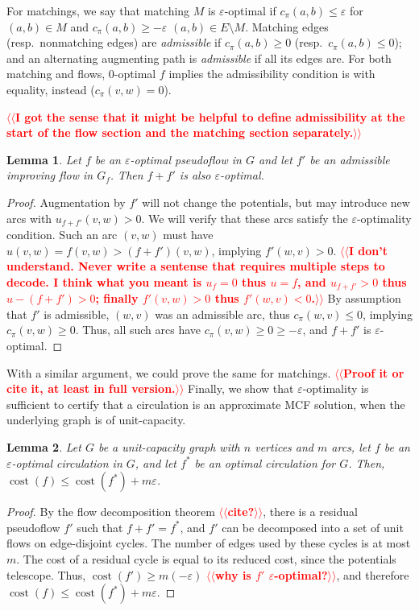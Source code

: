 \documentclass[11pt]{article}
\makeatletter
\def\eps{\varepsilon}
\theoremstyle{plain}
\newtheorem{lemma}{Lemma}
\def\cost{\operatorname{cost}}
\def\n@te#1{\textsf{\boldmath \textbf{$\langle\!\langle$#1$\rangle\!\rangle$}}\leavevmode}
\def\note#1{\textcolor{red}{\n@te{#1}}}
\makeatother
\begin{document}
For matchings, we say that matching $M$ is $\eps$-optimal if $c_\pi(a, b) \leq \eps$ for
$(a, b) \in M$ and $c_\pi(a, b) \geq -\eps$ $(a, b) \in E \setminus M$.
Matching edges (resp.\ nonmatching edges) are \emph{admissible} if $c_\pi(a, b) \geq 0$ (resp.\ $c_\pi(a, b) \leq 0$); and an alternating augmenting path is \emph{admissible}
if all its edges are.
For both matching and flows, 0-optimal $f$ implies the admissibility condition
is with equality, instead ($c_\pi(v, w) = 0$).

\note{I got the sense that it might be helpful to define admissibility at the start of the flow section and the matching section separately.}

\begin{lemma}
	Let $f$ be an $\eps$-optimal pseudoflow in $G$ and let $f'$ be an
	admissible improving flow in $G_f$.
	Then $f + f'$ is also $\eps$-optimal.
\end{lemma}
\begin{proof}
	Augmentation by $f'$ will not change the potentials, but may introduce
	new arcs with $u_{f+f'}(v, w) > 0$.
	We will verify that these arcs satisfy the $\eps$-optimality condition.
	Such an arc $(v, w)$ must have $u(v, w) = f(v, w) > (f+f')(v, w)$,
	implying $f'(w, v) > 0$.
\note{I don't understand.  Never write a sentense that requires multiple steps to decode. I think what you meant is $u_f = 0$ thus $u=f$, and $u_{f+f'} > 0$ thus $u-(f+f') > 0$; finally $f'(v,w) > 0$ thus $f'(w,v) < 0$.}
	By assumption that $f'$ is admissible, $(w, v)$ was an admissible arc, thus
	$c_\pi(w, v) \leq 0$, implying $c_\pi(v, w) \geq 0$.
	Thus, all such arcs have $c_\pi(v, w) \geq 0 \geq -\eps$, and $f + f'$
	is $\eps$-optimal.
\end{proof}

With a similar argument, we could prove the same for matchings. \note{Proof it or cite it, at least in full version.}
Finally, we show that $\eps$-optimality is sufficient to certify that a
circulation is an approximate MCF solution, when the underlying graph is
of unit-capacity.

\begin{lemma}
\label{lemma:mcf_cost}
	Let $G$ be a unit-capacity graph with $n$ vertices and $m$ arcs,
	let $f$ be an $\eps$-optimal circulation in $G$, and let $f^*$ be an optimal circulation for $G$.
	Then, $\cost(f) \leq \cost(f^*) + m\eps$.
\end{lemma}
\begin{proof}
	By the flow decomposition theorem \note{cite?}, there is a residual pseudoflow
	$f'$ such that $f + f' = f^*$, and $f'$ can be decomposed into a set of
	unit flows on edge-disjoint cycles.
	The number of edges used by these cycles is at most $m$.
	The cost of a residual cycle is equal to its reduced cost, since the
	potentials telescope.
	Thus, $\cost(f') \geq m(-\eps)$ \note{why is $f'$ $\eps$-optimal?}, and therefore
	$\cost(f) \leq \cost(f^*) + m\eps$.
\end{proof}
\end{document}
